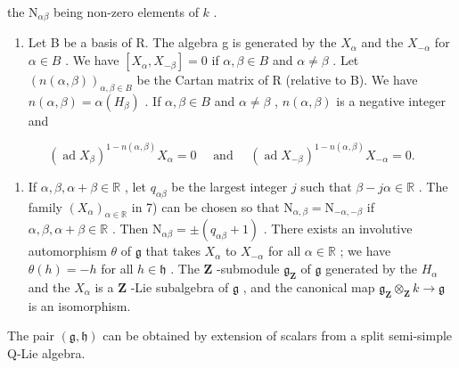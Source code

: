 the \(\mathrm{N}_{\alpha \beta}\) being non-zero elements of \(k\) .

\begin{enumerate}
\def\labelenumi{\arabic{enumi})}
\setcounter{enumi}{7}
\tightlist
\item
  Let B be a basis of R. The algebra g is generated by the \(X_{\alpha}\) and the \(X_{-\alpha}\) for \(\alpha \in B\) . We have \([X_{\alpha}, X_{-\beta}] = 0\) if \(\alpha, \beta \in B\) and \(\alpha \neq \beta\) . Let \((n(\alpha, \beta))_{\alpha, \beta \in B}\) be the Cartan matrix of R (relative to B). We have \(n(\alpha, \beta) = \alpha(H_{\beta})\) . If \(\alpha, \beta \in B\) and \(\alpha \neq \beta\) , \(n(\alpha, \beta)\) is a negative integer and
\end{enumerate}

\[
(\operatorname{ad} X _ {\beta}) ^ {1 - n (\alpha , \beta)} X _ {\alpha} = 0 \quad \text { and } \quad (\operatorname{ad} X _ {- \beta}) ^ {1 - n (\alpha , \beta)} X _ {- \alpha} = 0.
\]

\begin{enumerate}
\def\labelenumi{\arabic{enumi})}
\setcounter{enumi}{8}
\tightlist
\item
  If \(\alpha, \beta, \alpha + \beta \in \mathbb{R}\) , let \(q_{\alpha \beta}\) be the largest integer \(j\) such that \(\beta - j\alpha \in \mathbb{R}\) . The family \((X_{\alpha})_{\alpha \in \mathbb{R}}\) in 7) can be chosen so that \(\mathrm{N}_{\alpha, \beta} = \mathrm{N}_{-\alpha, -\beta}\) if \(\alpha, \beta, \alpha + \beta \in \mathbb{R}\) . Then \(\mathrm{N}_{\alpha \beta} = \pm (q_{\alpha \beta} + 1)\) . There exists an involutive automorphism \(\theta\) of \(\mathfrak{g}\) that takes \(X_{\alpha}\) to \(X_{-\alpha}\) for all \(\alpha \in \mathbb{R}\) ; we have \(\theta(h) = -h\) for all \(h \in \mathfrak{h}\) . The \(\mathbf{Z}\) -submodule \(\mathfrak{g}_{\mathbf{Z}}\) of \(\mathfrak{g}\) generated by the \(H_{\alpha}\) and the \(X_{\alpha}\) is a \(\mathbf{Z}\) -Lie subalgebra of \(\mathfrak{g}\) , and the canonical map \(\mathfrak{g}_{\mathbf{Z}} \otimes_{\mathbf{Z}} k \to \mathfrak{g}\) is an isomorphism.
\end{enumerate}

The pair \((\mathfrak{g},\mathfrak{h})\) can be obtained by extension of scalars from a split semi-simple Q-Lie algebra.


